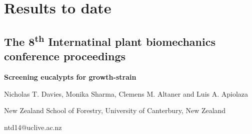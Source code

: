 \section{Results to date}
\subsection{ The 8\textsuperscript{th} Internatinal plant biomechanics conference proceedings}
\begin{center}
\textbf{Screening eucalypts for growth-strain}

Nicholas T. Davies, Monika Sharma, Clemens M. Altaner and Luis A. Apiolaza

New Zealand School of Forestry, University of Canterbury, New Zealand

ntd14@uclive.ac.nz  
\end{center}

